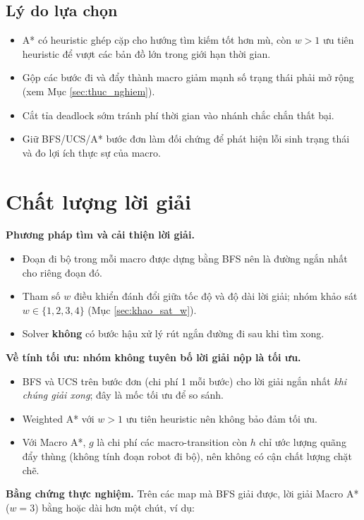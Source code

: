 \documentclass[a4paper,12pt]{article}
\begin{document}
\subsection{Lý do lựa chọn}

\begin{itemize}
    \item A* có heuristic ghép cặp cho hướng tìm kiếm tốt hơn mù, còn $w > 1$ ưu tiên heuristic để vượt các bản đồ lớn trong giới hạn thời gian.
    \item Gộp các bước đi và đẩy thành macro giảm mạnh số trạng thái phải mở rộng (xem Mục \ref{sec:thuc_nghiem}).
    \item Cắt tỉa deadlock sớm tránh phí thời gian vào nhánh chắc chắn thất bại.
    \item Giữ BFS/UCS/A* bước đơn làm đối chứng để phát hiện lỗi sinh trạng thái và đo lợi ích thực sự của macro.
\end{itemize}

\section{Chất lượng lời giải}

\textbf{Phương pháp tìm và cải thiện lời giải.}
\begin{itemize}
    \item Đoạn đi bộ trong mỗi macro được dựng bằng BFS nên là đường ngắn nhất cho riêng đoạn đó.
    \item Tham số $w$ điều khiển đánh đổi giữa tốc độ và độ dài lời giải; nhóm khảo sát $w \in \{1, 2, 3, 4\}$ (Mục \ref{sec:khao_sat_w}).
    \item Solver \textbf{không} có bước hậu xử lý rút ngắn đường đi sau khi tìm xong.
\end{itemize}

\textbf{Về tính tối ưu: nhóm không tuyên bố lời giải nộp là tối ưu.}
\begin{itemize}
    \item BFS và UCS trên bước đơn (chi phí 1 mỗi bước) cho lời giải ngắn nhất \textit{khi chúng giải xong}; đây là mốc tối ưu để so sánh.
    \item Weighted A* với $w > 1$ ưu tiên heuristic nên không bảo đảm tối ưu.
    \item Với Macro A*, $g$ là chi phí các macro-transition còn $h$ chỉ ước lượng quãng đẩy thùng (không tính đoạn robot đi bộ), nên không có cận chất lượng chặt chẽ.
\end{itemize}

\textbf{Bằng chứng thực nghiệm.} Trên các map mà BFS giải được, lời giải Macro A* ($w = 3$) bằng hoặc dài hơn một chút, ví dụ:
\end{document}
